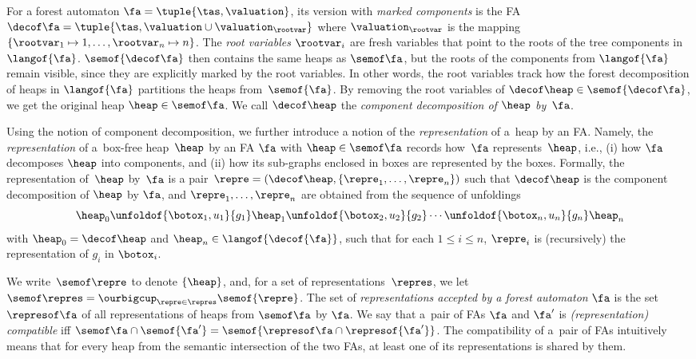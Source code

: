 For a forest automaton $\fa = \tuple{\tas,\valuation}$, its version with \emph{marked components}
is the FA 
$\decof\fa = \tuple{\tas,\valuation\cup\valuation_\rootvar}$ 
where
$\valuation_\rootvar$ is the mapping $\{\rootvar_1\mapsto
1,\ldots,\rootvar_n\mapsto n\}$.
%
The \emph{root variables} $\rootvar_i$ are fresh variables that
point to the roots of the tree components in $\langof{\fa}$. 
%
$\semof{\decof\fa}$ then contains the same heaps as $\semof\fa$, but the
roots of the components from $\langof{\fa}$ remain visible, since they are explicitly marked by the root variables.
%
In other words, the root variables track how the forest decomposition of heaps
in $\langof{\fa}$ partitions the heaps from~$\semof{\fa}$. 
%
By removing the root variables of $\decof\heap\in\semof{\decof\fa}$, we get the
original heap $\heap\in\semof\fa$. We call $\decof\heap$ the \emph{component
decomposition of $\heap$ by~$\fa$}.

Using the notion of component decomposition, we further introduce a notion of
the \emph{representation} of a~heap by an FA. Namely, the \emph{representation}
of a~box-free heap~$\heap$ by an FA $\fa$ with $\heap\in\semof\fa$ records
how~$\fa$ represents~$\heap$, i.e., (i) how $\fa$ decomposes $\heap$ into
components, and (ii) how its sub-graphs enclosed in boxes are represented by the
boxes. 
%
Formally, the representation of~$\heap$ by~$\fa$ is a pair~$\repre =
(\decof\heap,\{\repre_1,\ldots,\repre_n\})$ such that $\decof\heap$ is the
component decomposition of $\heap$ by $\fa$, and $\repre_1,\ldots,\repre_n$ are
obtained from the sequence of unfoldings\vspace*{-0.5mm}
%
\begin{equation*} 
\heap_0
\unfoldof{\botox_{1}, u_{1}}{g_{1}} 
\heap_1
\unfoldof{\botox_{2}, u_{2}}{g_{2}} 
\cdots
\unfoldof{\botox_{n}, u_{n}}{g_{n}}   
 \heap_n 
\end{equation*}
%
with $\heap_0 = \decof\heap$ and $\heap_n\in\langof{\decof{\fa}}$, such that for
each $1\leq i\leq n$, $\repre_i$ is (recursively) the representation of $g_i$ in
$\botox_i$.

We write~$\semof\repre$ to denote $\{\heap\}$, and,
%
for a set of representations~$\repres$, we let $\semof\repres =
\ourbigcup_{\repre\in\repres} \semof{\repre}$.
%
The set of \emph{representations accepted by a forest automaton} $\fa$
is the set $\represof\fa$ of all representations of heaps from
$\semof\fa$ by $\fa$. 
%
We say that a~pair of FAs $\fa$ and $\fa'$ is \emph{(representation) compatible} iff $\semof \fa \cap
\semof {\fa'} = \semof{\represof \fa \cap \represof{\fa'}}$.
%
The compatibility of a~pair of FAs intuitively means that for every heap from the semantic intersection of the two FAs,
at least one of its representations is shared by them.
%

